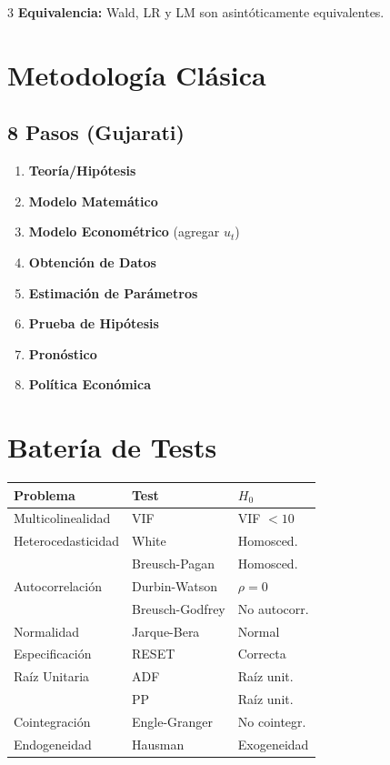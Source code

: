 \documentclass[9pt, spanish, twoside]{article}
\newcommand{\techfont}{\fontfamily{phv}\selectfont}
\newcommand{\critical}[1]{\textcolor{CriticalRed}{\textbf{#1}}}
\begin{document}
\begin{multicols*}{3}
\critical{Equivalencia:} Wald, LR y LM son asintóticamente equivalentes.

\section{Metodología Clásica}
\subsection{8 Pasos (Gujarati)}
\begin{enumerate}[leftmargin=8pt, itemsep=1pt, topsep=2pt]
    \item \textbf{Teoría/Hipótesis}
    \item \textbf{Modelo Matemático}
    \item \textbf{Modelo Econométrico} (agregar $u_t$)
    \item \textbf{Obtención de Datos}
    \item \textbf{Estimación de Parámetros}
    \item \textbf{Prueba de Hipótesis}
    \item \textbf{Pronóstico}
    \item \textbf{Política Económica}
\end{enumerate}

\section{Batería de Tests}
\vspace{4pt}
\begin{center}
\scriptsize\techfont
\begin{tabular}{@{}lll@{}}
\toprule
\textbf{Problema} & \textbf{Test} & \textbf{$H_0$} \\
\midrule
Multicolinealidad & VIF & VIF $< 10$ \\
Heterocedasticidad & White & Homosced. \\
 & Breusch-Pagan & Homosced. \\
Autocorrelación & Durbin-Watson & $\rho = 0$ \\
 & Breusch-Godfrey & No autocorr. \\
Normalidad & Jarque-Bera & Normal \\
Especificación & RESET & Correcta \\
Raíz Unitaria & ADF & Raíz unit. \\
 & PP & Raíz unit. \\
Cointegración & Engle-Granger & No cointegr. \\
Endogeneidad & Hausman & Exogeneidad \\
\bottomrule
\end{tabular}
\end{center}
\vspace{4pt}


\end{multicols*}
\end{document}
